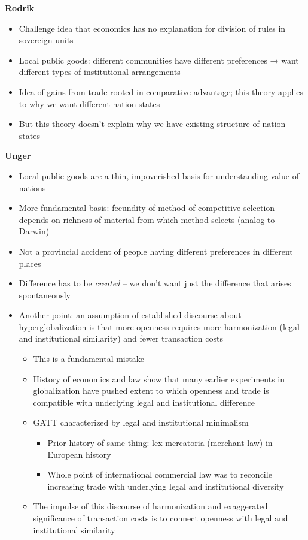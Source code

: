 \textbf{Rodrik}

\begin{itemize}
\tightlist
\item
  Challenge idea that economics has no explanation for division of rules
  in sovereign units
\item
  Local public goods: different communities have different preferences →
  want different types of institutional arrangements
\item
  Idea of gains from trade rooted in comparative advantage; this theory
  applies to why we want different nation-states
\item
  But this theory doesn't explain why we have existing structure of
  nation-states
\end{itemize}

\textbf{Unger}

\begin{itemize}
\tightlist
\item
  Local public goods are a thin, impoverished basis for understanding
  value of nations
\item
  More fundamental basis: fecundity of method of competitive selection
  depends on richness of material from which method selects (analog to
  Darwin)
\item
  Not a provincial accident of people having different preferences in
  different places
\item
  Difference has to be \emph{created} -- we don't want just the
  difference that arises spontaneously
\item
  Another point: an assumption of established discourse about
  hyperglobalization is that more openness requires more harmonization
  (legal and institutional similarity) and fewer transaction costs

  \begin{itemize}
  \tightlist
  \item
    This is a fundamental mistake
  \item
    History of economics and law show that many earlier experiments in
    globalization have pushed extent to which openness and trade is
    compatible with underlying legal and institutional difference
  \item
    GATT characterized by legal and institutional minimalism

    \begin{itemize}
    \tightlist
    \item
      Prior history of same thing: lex mercatoria (merchant law) in
      European history
    \item
      Whole point of international commercial law was to reconcile
      increasing trade with underlying legal and institutional diversity
    \end{itemize}
  \item
    The impulse of this discourse of harmonization and exaggerated
    significance of transaction costs is to connect openness with legal
    and institutional similarity
  \end{itemize}
\end{itemize}

